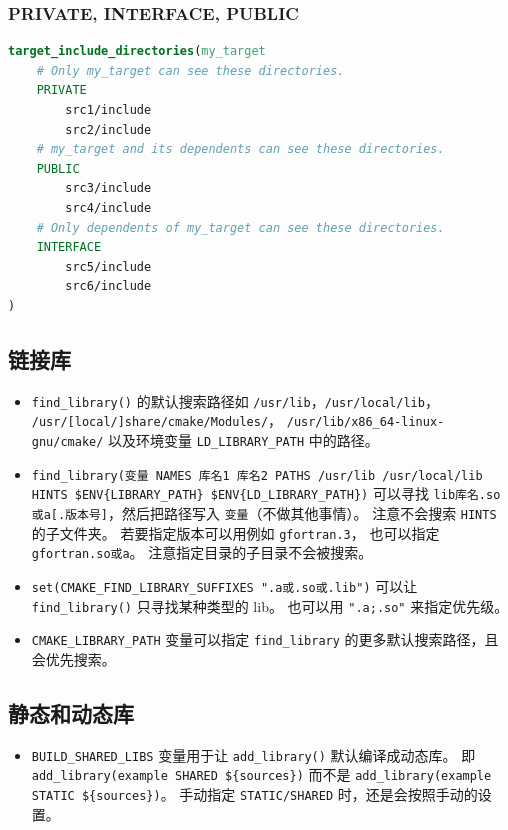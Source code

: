 \subsubsection{PRIVATE, INTERFACE, PUBLIC}
\begin{lstlisting}[language=cmake]
target_include_directories(my_target
    # Only my_target can see these directories.
    PRIVATE
        src1/include
        src2/include
    # my_target and its dependents can see these directories.
    PUBLIC
        src3/include
        src4/include
    # Only dependents of my_target can see these directories.
    INTERFACE
        src5/include
        src6/include
)
\end{lstlisting}

\subsection{链接库}
\begin{itemize}
\item \verb`find_library()` 的默认搜索路径如 \verb`/usr/lib`，\verb`/usr/local/lib`， \verb`/usr/[local/]share/cmake/Modules/`， \verb`/usr/lib/x86_64-linux-gnu/cmake/` 以及环境变量 \verb`LD_LIBRARY_PATH` 中的路径。
\item \verb`find_library(变量 NAMES 库名1 库名2 PATHS /usr/lib /usr/local/lib HINTS $ENV{LIBRARY_PATH} $ENV{LD_LIBRARY_PATH})` 可以寻找 \verb`lib库名.so或a[.版本号]`，然后把路径写入 \verb`变量`（不做其他事情）。 注意不会搜索 \verb`HINTS` 的子文件夹。 若要指定版本可以用例如 \verb`gfortran.3`， 也可以指定 \verb`gfortran.so或a`。 注意指定目录的子目录不会被搜索。
\item \verb`set(CMAKE_FIND_LIBRARY_SUFFIXES ".a或.so或.lib")` 可以让 \verb`find_library()` 只寻找某种类型的 lib。 也可以用 \verb`".a;.so"` 来指定优先级。
\item \verb`CMAKE_LIBRARY_PATH` 变量可以指定 \verb`find_library` 的更多默认搜索路径，且会优先搜索。
\end{itemize}

\subsection{静态和动态库}
\begin{itemize}
\item \verb`BUILD_SHARED_LIBS` 变量用于让 \verb`add_library()` 默认编译成动态库。 即 \verb`add_library(example SHARED ${sources})` 而不是 \verb`add_library(example STATIC ${sources})`。 手动指定 \verb`STATIC/SHARED` 时，还是会按照手动的设置。
\end{itemize}


